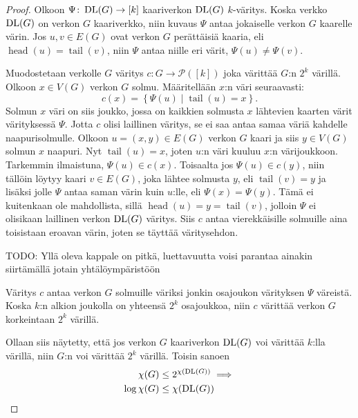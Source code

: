\documentclass[finnish]{tktltiki2}
\theoremstyle{definition}
\theoremstyle{remark}
\newcommand{\set}[1]{\left\{ #1 \right\}}
\newcommand{\powerset}{\mathcal{P}}
\newcommand{\from}{\colon}
\DeclareMathOperator{\head}{head}
\DeclareMathOperator{\tail}{tail}
\begin{document}
\begin{proof}
    Olkoon $\Psi \from \DLG \to [k]$ kaariverkon $\operatorname{DL}(G)$ $k$-väritys. Koska
    verkko $\operatorname{DL}(G)$ on verkon $G$ kaariverkko, niin kuvaus $\Psi$ antaa
    jokaiselle verkon $G$ kaarelle värin. Jos $u, v \in E(G)$ ovat verkon $G$
    perättäisiä kaaria, eli $\head(u) = \tail(v)$, niin $\Psi$ antaa niille eri
    värit, $\Psi(u) \neq \Psi(v)$.

    Muodostetaan verkolle $G$ väritys $c \from G \to \powerset([k])$ joka
    värittää $G$:n $2^k$ värillä. Olkoon $x \in V(G)$ verkon $G$ solmu.
    Määritellään $x$:n väri seuraavasti:
    \begin{equation*}
        c(x) = \set{\Psi(u) \mid \tail(u) = x}.
    \end{equation*}
    Solmun $x$ väri on siis joukko, jossa on kaikkien solmusta $x$ lähtevien
    kaarten värit värityksessä $\Psi$. Jotta $c$ olisi laillinen väritys, se ei
    saa antaa samaa väriä kahdelle naapurisolmulle. Olkoon $u = (x,y) \in E(G)$
    verkon $G$ kaari ja siis $y \in V(G)$ solmun $x$ naapuri. Nyt $\tail(u) =
    x$, joten $u$:n väri kuuluu $x$:n värijoukkoon. Tarkemmin ilmaistuna,
    $\Psi(u) \in c(x)$. Toisaalta jos $\Psi(u) \in c(y)$, niin tällöin löytyy
    kaari $v \in E(G)$, joka lähtee solmusta $y$, eli $\tail(v) = y$ ja lisäksi
    jolle $\Psi$ antaa saman värin kuin $u$:lle, eli $\Psi(x) = \Psi(y)$. Tämä
    ei kuitenkaan ole mahdollista, sillä $\head(u) = y = \tail(v)$, jolloin
    $\Psi$ ei olisikaan laillinen verkon $\operatorname{DL}(G)$ väritys. Siis $c$ antaa
    vierekkäisille solmuille aina toisistaan eroavan värin, joten se täyttää
    väritysehdon.

    TODO: Yllä oleva kappale on pitkä, luettavuutta voisi parantaa ainakin
    siirtämällä jotain yhtälöympäristöön

    Väritys $c$ antaa verkon $G$ solmuille väriksi jonkin osajoukon värityksen
    $\Psi$ väreistä. Koska $k$:n alkion joukolla on yhteensä $2^k$ osajoukkoa,
    niin $c$ värittää verkon $G$ korkeintaan $2^k$ värillä.

    Ollaan siis näytetty, että jos verkon $G$ kaariverkon $\operatorname{DL}(G)$ voi värittää $k$:lla
    värillä, niin $G$:n voi värittää $2^k$ värillä. Toisin sanoen
    \begin{align*}
        \chi(G) &\leq 2^{\chi(\operatorname{DL}(G))} \implies \\
        \log \chi(G) &\leq \chi(\operatorname{DL}(G))
    \end{align*}
\end{proof}
\end{document}
